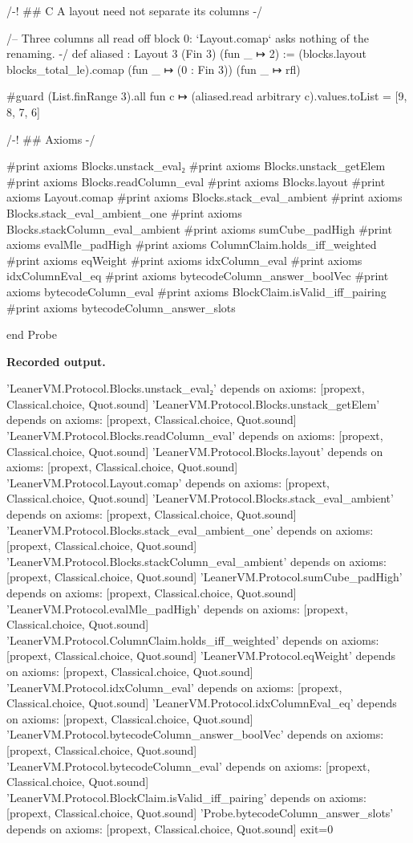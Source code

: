 \begin{leancode}
/-! ## C A layout need not separate its columns -/

/-- Three columns all read off block 0: `Layout.comap` asks nothing of the renaming. -/
def aliased : Layout 3 (Fin 3) (fun _ ↦ 2) :=
  (blocks.layout blocks_total_le).comap (fun _ ↦ (0 : Fin 3)) (fun _ ↦ rfl)

#guard (List.finRange 3).all fun c ↦ (aliased.read arbitrary c).values.toList = [9, 8, 7, 6]

/-! ## Axioms -/

#print axioms Blocks.unstack_eval₂
#print axioms Blocks.unstack_getElem
#print axioms Blocks.readColumn_eval
#print axioms Blocks.layout
#print axioms Layout.comap
#print axioms Blocks.stack_eval_ambient
#print axioms Blocks.stack_eval_ambient_one
#print axioms Blocks.stackColumn_eval_ambient
#print axioms sumCube_padHigh
#print axioms evalMle_padHigh
#print axioms ColumnClaim.holds_iff_weighted
#print axioms eqWeight
#print axioms idxColumn_eval
#print axioms idxColumnEval_eq
#print axioms bytecodeColumn_answer_boolVec
#print axioms bytecodeColumn_eval
#print axioms BlockClaim.isValid_iff_pairing
#print axioms bytecodeColumn_answer_slots

end Probe
\end{leancode}

\textbf{Recorded output.}

\begin{srccode}
'LeanerVM.Protocol.Blocks.unstack_eval₂' depends on axioms: [propext, Classical.choice, Quot.sound]
'LeanerVM.Protocol.Blocks.unstack_getElem' depends on axioms: [propext, Classical.choice, Quot.sound]
'LeanerVM.Protocol.Blocks.readColumn_eval' depends on axioms: [propext, Classical.choice, Quot.sound]
'LeanerVM.Protocol.Blocks.layout' depends on axioms: [propext, Classical.choice, Quot.sound]
'LeanerVM.Protocol.Layout.comap' depends on axioms: [propext, Classical.choice, Quot.sound]
'LeanerVM.Protocol.Blocks.stack_eval_ambient' depends on axioms: [propext, Classical.choice, Quot.sound]
'LeanerVM.Protocol.Blocks.stack_eval_ambient_one' depends on axioms: [propext, Classical.choice, Quot.sound]
'LeanerVM.Protocol.Blocks.stackColumn_eval_ambient' depends on axioms: [propext, Classical.choice, Quot.sound]
'LeanerVM.Protocol.sumCube_padHigh' depends on axioms: [propext, Classical.choice, Quot.sound]
'LeanerVM.Protocol.evalMle_padHigh' depends on axioms: [propext, Classical.choice, Quot.sound]
'LeanerVM.Protocol.ColumnClaim.holds_iff_weighted' depends on axioms: [propext, Classical.choice, Quot.sound]
'LeanerVM.Protocol.eqWeight' depends on axioms: [propext, Classical.choice, Quot.sound]
'LeanerVM.Protocol.idxColumn_eval' depends on axioms: [propext, Classical.choice, Quot.sound]
'LeanerVM.Protocol.idxColumnEval_eq' depends on axioms: [propext, Classical.choice, Quot.sound]
'LeanerVM.Protocol.bytecodeColumn_answer_boolVec' depends on axioms: [propext, Classical.choice, Quot.sound]
'LeanerVM.Protocol.bytecodeColumn_eval' depends on axioms: [propext, Classical.choice, Quot.sound]
'LeanerVM.Protocol.BlockClaim.isValid_iff_pairing' depends on axioms: [propext, Classical.choice, Quot.sound]
'Probe.bytecodeColumn_answer_slots' depends on axioms: [propext, Classical.choice, Quot.sound]
exit=0
\end{srccode}

